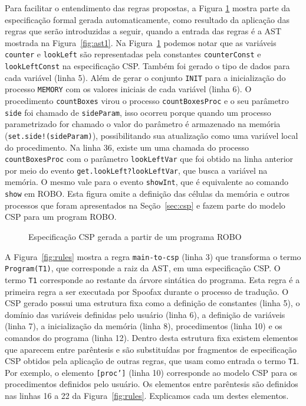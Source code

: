 Para facilitar o entendimento das regras propostas, a Figura \ref{fig:progcsp} mostra parte da especificação formal gerada automaticamente, como resultado da aplicação das regras que serão introduzidas a seguir, quando a entrada das regras é a AST mostrada na Figura~\ref{fig:ast1}. 
Na Figura~\ref{fig:progcsp} podemos notar que as variáveis \texttt{counter} e \texttt{lookLeft} são representadas pela constantes \texttt{counterConst} e \texttt{lookLeftConst} na especificação CSP. Também foi gerado o tipo de dados para cada variável (linha 5). Além de gerar o conjunto \texttt{INIT} para a inicialização do processo \texttt{MEMORY} com os valores iniciais de cada variável (linha 6). O procedimento \texttt{countBoxes} virou o processo \texttt{countBoxesProc} e o seu parâmetro \texttt{side} foi chamado de \texttt{sideParam}, isso ocorreu porque quando um processo parametrizado for chamado o valor do parâmetro é armazenado na memória (\texttt{set.side!(sideParam)}), possibilitando sua atualização como uma variável local do procedimento. Na linha 36, existe um uma chamada do processo \texttt{countBoxesProc} com o parâmetro \texttt{lookLeftVar} que foi obtido na linha anterior por meio do evento \texttt{get.lookLeft?lookLeftVar}, que busca a variável na memória. O mesmo vale para o evento \texttt{showInt}, que é equivalente ao comando \texttt{show} em ROBO. Esta figura omite a definição das células da memória e outros processos que foram apresentados na Seção~\ref{sec:csp} e fazem parte do modelo CSP para um program ROBO.  

\begin{figure}[!h]
\centering
\caption{Especificação CSP gerada a partir de um programa ROBO}

\label{fig:progcsp}
\end{figure}

A Figura~\ref{fig:rules} mostra a regra \texttt{main-to-csp} (linha 3) que transforma o termo \texttt{Program(T1)}, que corresponde a raiz da AST, em uma especificação CSP. O termo \texttt{T1} corresponde ao restante da árvore sintática do programa. Esta regra é a primeira regra a ser executada por Spoofax durante o processo de tradução. O CSP gerado possui uma estrutura fixa como a definição de constantes (linha 5), o domínio das variáveis definidas pelo usuário (linha 6), a definição de variáveis (linha 7), a inicialização da memória (linha 8), procedimentos (linha 10) e os comandos do programa (linha 12). Dentro desta estrutura fixa existem elementos que aparecem entre parêntesis e são substituídas por fragmentos de especificação CSP obtidos pela aplicação de outras regras, que usam como entrada o termo \texttt{T1}. Por exemplo, o elemento \texttt{[proc']} (linha 10) corresponde ao modelo CSP para os procedimentos definidos pelo usuário. Os elementos entre parêntesis são definidos nas linhas 16 a 22 da Figura~\ref{fig:rules}. Explicamos cada um destes elementos.


